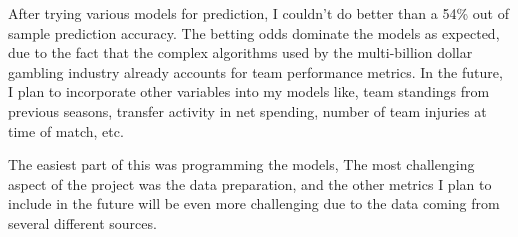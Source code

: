 \documentclass[
]{article}
\begin{document}
After trying various models for prediction, I couldn't do better than a
54\% out of sample prediction accuracy. The betting odds dominate the
models as expected, due to the fact that the complex algorithms used by
the multi-billion dollar gambling industry already accounts for team
performance metrics. In the future, I plan to incorporate other
variables into my models like, team standings from previous seasons,
transfer activity in net spending, number of team injuries at time of
match, etc.

The easiest part of this was programming the models, The most
challenging aspect of the project was the data preparation, and the
other metrics I plan to include in the future will be even more
challenging due to the data coming from several different sources.
\end{document}
